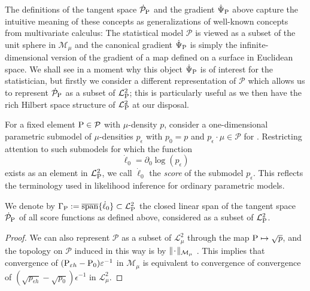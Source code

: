 \documentclass[a4,danish]{article}
\begin{document}
The definitions of the tangent space $\dot{\mathcal{P}}_{\P}$ and the gradient $\dot{\TT}_{\P}$
above capture the intuitive meaning of these concepts as generalizations of well-known concepts from
multivariate calculus: The statistical model $\mathcal{P}$ is viewed as a subset of the unit sphere
in $\mathcal{M}_{\mu}$ and the canonical gradient $\dot{\TT}_{\P}$ is simply the
infinite-dimensional version of the gradient of a map defined on a surface in Euclidean space. We
shall see in a moment why this object $\dot{\TT}_{\P}$ is of interest for the statistician, but
firstly we consider a different representation of $\mathcal{P}$ which allows us to represent
$\dot{\mathcal{P}}_{\P}$ as a subset of $\lp$; this is particularly useful as we then
have the rich Hilbert space structure of $\lp$ at our disposal.

For a fixed element $\P \in \mathcal{P}$ with $\mu$-density $p$, consider a one-dimensional
parametric submodel of $\mu$-densities $p_{\epsilon}$ with $p_0=p$ and
$p_{\epsilon} \cdot \mu \in \mathcal{P}$ for . Restricting
attention to such submodels for which the function
\begin{equation*}
  \dot{\ell}_0 = \partial_0 \log(p_{\epsilon})
\end{equation*}
exists as an element in $\lp$, we call $\dot{\ell}_0$ the
\textit{score} of the submodel $p_{\epsilon}$. This reflects the
terminology used in likelihood inference for ordinary parametric
models.

\begin{proposition}
  \label{prop:repr-tang-spac}
  We denote by
  $\Gamma_{\P} := \overline{\mathrm{span}}\{\dot{\ell}_0\} \subset
  \lp$ the closed linear span of the tangent space
  $\dot{\mathcal{P}}_{\P}$ of all score functions as defined above,
  considered as a subset of $\lp$.
\end{proposition}

\begin{proof}
   We can also
  represent $\mathcal{P}$ as a subset of $\mathcal{L}_{\mu}^2$ through the map
  $\P \mapsto \sqrt{p}$, and the topology on $\mathcal{P}$ induced in this way is  by
  $\Vert \blank \Vert_{\mathcal{M}_{\mu}}$ \citep{bickel1993efficient}. This implies that
  convergence of $(\P_{\epsilon h} - \P_{0})\epsilon^{-1}$ in $\mathcal{M}_{\mu}$ is equivalent to
  convergence of convergence of $(\sqrt{p_{\epsilon h}} - \sqrt{p_{0}})\epsilon^{-1}$ in
  $\mathcal{L}_{\mu}^2$. 
\end{proof}
\end{document}
